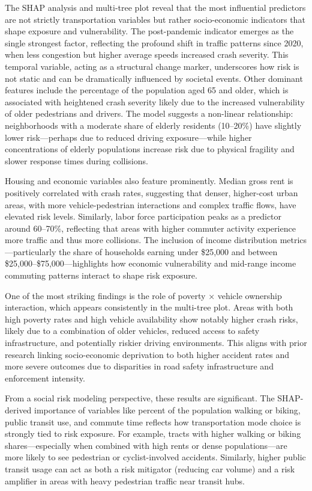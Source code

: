 \documentclass[
  number,
  review,
  3p]{elsarticle}
\begin{document}
The SHAP analysis and multi-tree plot reveal that the most influential
predictors are not strictly transportation variables but rather
socio-economic indicators that shape exposure and vulnerability. The
post-pandemic indicator emerges as the single strongest factor,
reflecting the profound shift in traffic patterns since 2020, when less
congestion but higher average speeds increased crash severity. This
temporal variable, acting as a structural change marker, underscores how
risk is not static and can be dramatically influenced by societal
events. Other dominant features include the percentage of the population
aged 65 and older, which is associated with heightened crash severity
likely due to the increased vulnerability of older pedestrians and
drivers. The model suggests a non-linear relationship: neighborhoods
with a moderate share of elderly residents (10--20\%) have slightly
lower risk---perhaps due to reduced driving exposure---while higher
concentrations of elderly populations increase risk due to physical
fragility and slower response times during collisions.

Housing and economic variables also feature prominently. Median gross
rent is positively correlated with crash rates, suggesting that denser,
higher-cost urban areas, with more vehicle-pedestrian interactions and
complex traffic flows, have elevated risk levels. Similarly, labor force
participation peaks as a predictor around 60--70\%, reflecting that
areas with higher commuter activity experience more traffic and thus
more collisions. The inclusion of income distribution
metrics---particularly the share of households earning under \$25,000
and between \$25,000--\$75,000---highlights how economic vulnerability
and mid-range income commuting patterns interact to shape risk exposure.

One of the most striking findings is the role of poverty × vehicle
ownership interaction, which appears consistently in the multi-tree
plot. Areas with both high poverty rates and high vehicle availability
show notably higher crash risks, likely due to a combination of older
vehicles, reduced access to safety infrastructure, and potentially
riskier driving environments. This aligns with prior research linking
socio-economic deprivation to both higher accident rates and more severe
outcomes due to disparities in road safety infrastructure and
enforcement intensity.

From a social risk modeling perspective, these results are significant.
The SHAP-derived importance of variables like percent of the population
walking or biking, public transit use, and commute time reflects how
transportation mode choice is strongly tied to risk exposure. For
example, tracts with higher walking or biking shares---especially when
combined with high rents or dense populations---are more likely to see
pedestrian or cyclist-involved accidents. Similarly, higher public
transit usage can act as both a risk mitigator (reducing car volume) and
a risk amplifier in areas with heavy pedestrian traffic near transit
hubs.
\end{document}
